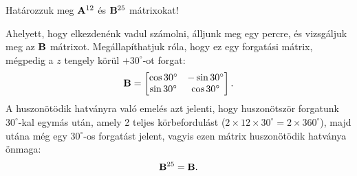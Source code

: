 \documentclass[exercise]{math-standalone}
\begin{document}
\begin{exercise}{Határozzuk meg $\mathbf{A}^{12}$ és $\mathbf{B}^{25}$ mátrixokat!}
{  \tcbline

  Ahelyett, hogy elkezdenénk vadul számolni, álljunk meg egy percre, és
  vizsgáljuk meg az $\mathbf{B}$ mátrixot. Megállapíthatjuk róla, hogy ez egy
  forgatási mátrix, mégpedig a $z$ tengely körül $+30^\circ$-ot forgat:
  \[
    \mathbf{B} = \begin{bmatrix}
      \cos 30^\circ & - \sin 30^\circ \\
      \sin 30^\circ & \cos 30^\circ
    \end{bmatrix}
    \text.
  \]
  A huszonötödik hatványra való emelés azt jelenti, hogy huszonötször forgatunk
  $30^\circ$-kal egymás után, amely 2 teljes körbefordulást ($2 \times 12 \times
    30^\circ = 2 \times 360^\circ$), majd utána még egy $30^\circ$-os forgatást
  jelent, vagyis ezen mátrix huszonötödik hatványa önmaga:
  \[
    \mathbf{B}^{25} = \mathbf{B}
    \text.
  \]
  }
\end{exercise}
\end{document}
